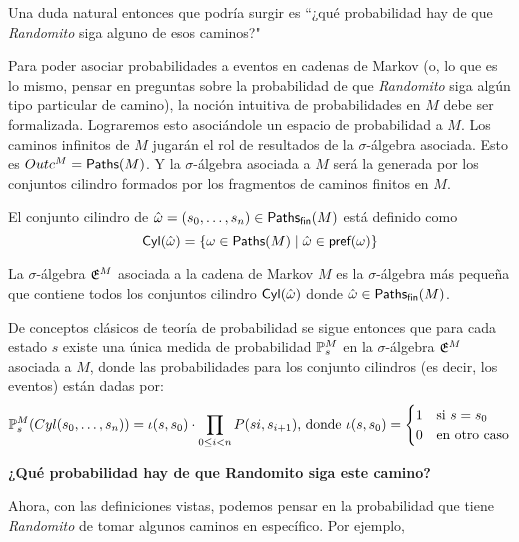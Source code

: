 Una duda natural entonces que podría surgir es ``¿qué probabilidad hay de que
\emph{Randomito} siga alguno de esos caminos?"

Para poder asociar probabilidades a eventos en cadenas de Markov (o, lo que es
lo mismo, pensar en preguntas sobre la probabilidad de que \emph{Randomito}
siga algún tipo particular de camino), la noción intuitiva de probabilidades en
$M$ debe ser formalizada. Lograremos esto asociándole un espacio de
probabilidad a $M$. Los caminos infinitos de $M$ jugarán el rol de resultados
de la $\sigma$-álgebra asociada. Esto es $Outc^M = \textsf{Paths}(M)$. Y la
$\sigma$-álgebra asociada a $M$ será la generada por los conjuntos cilindro
formados por los fragmentos de caminos finitos en $M$.

\begin{definition}
	El conjunto cilindro de $\hat \omega = (s_0, \dots, s_n) \in \textsf{Paths}_\textsf{fin}(M)$ está definido como
	$$\textsf{Cyl}(\hat \omega) = \{\omega \in \textsf{Paths}(M) \mid \hat \omega \in \textsf{pref}(\omega)\}$$
\end{definition}

\begin{definition}
	La $\sigma$-álgebra $\mathfrak{E}^M$ asociada a la cadena de Markov $M$ es la $\sigma$-álgebra más pequeña que contiene todos los conjuntos cilindro $\textsf{Cyl}(\hat \omega)$ donde $\hat \omega \in \textsf{Paths}_\textsf{fin}(M)$.
\end{definition}

De conceptos clásicos de teoría de probabilidad se sigue entonces que para cada
estado $s$ existe una única medida de probabilidad $\mathbb{P}^M_{s}$ en la
$\sigma$-álgebra $\mathfrak{E}^M$ asociada a $M$, donde las probabilidades para los
conjunto cilindros (es decir, los eventos) están dadas por:
\begin{equation}
	\label{probMC}
	\mathbb{P}^M_{s}(Cyl(s_0, \dots, s_n)) = \iota(s,s_0) \cdot \prod_{0 \leq i < n} P(si, s_{i+1})\text{, donde }\iota(s,s_0) =
	\begin{cases}
		1 &\text{si } s = s_0 \\
		0 &\text{en otro caso}
	\end{cases}
\end{equation}

\textbf{¿Qué probabilidad hay de que Randomito siga este camino?}

Ahora, con las definiciones vistas, podemos pensar en la probabilidad que tiene
\emph{Randomito} de tomar algunos caminos en específico. Por ejemplo,

